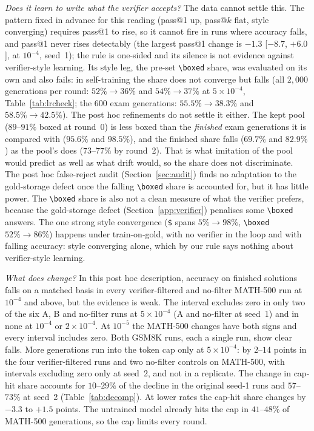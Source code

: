 \documentclass[runningheads]{llncs}
\begin{document}
\emph{Does it learn to write what the verifier accepts?} The data cannot settle
this. The pattern fixed in advance for this reading (pass@1 up, pass@$k$ flat,
style converging) requires pass@1 to rise, so it cannot fire in runs where
accuracy falls, and pass@1 never rises detectably (the largest pass@1 change is $-1.3$
[$-8.7$, $+6.0$], at $10^{-4}$, seed~1); the rule is one-sided and its silence is
not evidence against verifier-style learning. Its style leg, the pre-set
\verb|\boxed| share, was evaluated on its own and also fails: in self-training
the share does not converge but falls (all $2{,}000$ generations per round:
$52\%\to36\%$ and $54\%\to37\%$ at $5\times10^{-4}$, Table~\ref{tab:lrcheck};
the $600$ exam generations: $55.5\%\to38.3\%$ and $58.5\%\to42.5\%$). The post
hoc refinements do not settle it either. The kept pool ($89$--$91\%$ boxed at
round~0) is less boxed than the \emph{finished} exam generations it is compared
with ($95.6\%$ and $98.5\%$), and the finished share falls ($69.7\%$ and
$82.9\%$) as the pool's does ($73$--$77\%$ by round~2). That is what imitation of
the pool would predict as well as what drift would, so the share does not
discriminate. The post hoc false-reject audit (Section~\ref{sec:audit}) finds
no adaptation to the gold-storage defect once the falling \verb|\boxed| share
is accounted for, but it has little power. The \verb|\boxed| share is also not a
clean measure of what the verifier prefers, because the gold-storage defect
(Section~\ref{app:verifier}) penalises some \verb|\boxed| answers. The one strong style convergence (\texttt{\$} spans
$5\%\to98\%$, \verb|\boxed| $52\%\to86\%$) happens under train-on-gold, with no
verifier in the loop and with falling accuracy: style converging alone, which by
our rule says nothing about verifier-style learning.

\emph{What does change?} In this post hoc description, accuracy on finished
solutions falls on a matched basis in every verifier-filtered and no-filter MATH-500 run at $10^{-4}$ and above,
but the evidence is weak. The interval excludes zero in only two of the six A, B and no-filter runs at $5\times10^{-4}$ (A and no-filter at seed~1) and in none at $10^{-4}$ or
$2\times10^{-4}$. At $10^{-5}$ the MATH-500 changes have both signs and every
interval includes zero. Both GSM8K runs, each a single run, show clear falls.
More generations run into the token cap only at $5\times10^{-4}$: by $2$--$14$
points in the four verifier-filtered runs and two no-filter controls on
MATH-500, with intervals excluding zero only at seed~2, and not in a replicate.
The change in cap-hit share accounts for $10$--$29\%$ of the decline in the
original seed-1 runs and $57$--$73\%$ at seed~2 (Table~\ref{tab:decomp}). At
lower rates the cap-hit share changes by $-3.3$ to $+1.5$ points. The untrained
model already hits the cap in $41$--$48\%$ of MATH-500 generations, so the cap
limits every round.
\end{document}
